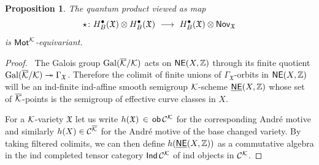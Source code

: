 \documentclass[twoside,leqno]{article}
\numberwithin{equation}{section}
\theoremstyle{plain}
\newtheorem{proposition}[equation]{Proposition}
\theoremstyle{definition}
\begin{document}
\begin{proposition}The quantum product viewed as map
\begin{equation} \label{eq:qupkay}
\star \colon H^{\bullet}_{B}(\mathfrak{X})\otimes
H^{\bullet}_{B}(\mathfrak{X}) \ \longrightarrow
\ H^{\bullet}_{B}(\mathfrak{X})\otimes \mathsf{Nov}_{\mathfrak{X}}
\end{equation}
is $\mathsf{Mot}^{\mathcal K}$-equivariant.
\end{proposition}
\begin{proof} \ The Galois group $\operatorname{Gal}(\overline{\mathcal K}/\mathcal K)$ acts on
$\mathsf{NE}(X,\mathbb Z)$ through its finite quotient $\operatorname{Gal}(\overline{\mathcal K}/\mathcal K)
\twoheadrightarrow \Gamma_{\mathfrak{X}}$. Therefore the colimit of
finite unions of $\Gamma_{\mathfrak{X}}$-orbits in
$\mathsf{NE}(X,\mathbb Z)$ will be an ind-finite ind-affine smooth semigroup
$\mathcal K$-scheme $\underline{\mathsf{NE}}(X,\mathbb Z)$ whose set of $\overline{\mathcal K}$-points is the
semigroup of effective curve classes in $X$.

For a $\mathcal K$-variety $\mathfrak{X}$ let us write $h(\mathfrak{X}) \,
\in \, \mathsf{ob}\, \mathcal{C}^{\mathcal K}$ for the corresponding Andr\'{e}
motive and similarly $h(X) \in \mathcal{C}^{\overline{\mathcal K}}$ for the Andr\'{e} motive of the base changed variety. By taking filtered colimits, we can then define
$h(\underline{\mathsf{NE}}(X,\mathbb Z))$ as a commutative algebra in the ind completed
tensor category $\mathsf{Ind}\, \mathcal{C}^{\mathcal K}$ of ind objects in
$\mathcal{C}^{\mathcal K}$.


\end{proof}
\end{document}
